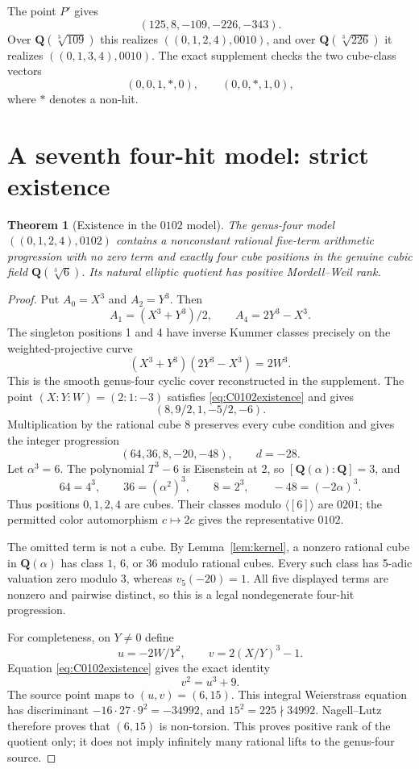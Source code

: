 \documentclass[10pt]{article}
\newtheorem{theorem}{Theorem}[section]
\newcommand{\Q}{\mathbf Q}
\begin{document}
The point $P'$ gives
\[
 (125,8,-109,-226,-343).
\]
Over $\Q(\sqrt[3]{109})$ this realizes $((0,1,2,4),0010)$, and over
$\Q(\sqrt[3]{226})$ it realizes $((0,1,3,4),0010)$.  The exact supplement
checks the two cube-class vectors
\[
 (0,0,1,\ast,0),\qquad (0,0,\ast,1,0),
\]
where $\ast$ denotes a non-hit.


\section{A seventh four-hit model: strict existence}

\begin{theorem}[Existence in the $0102$ model]\label{thm:0102existence}
The genus-four model $((0,1,2,4),0102)$ contains a nonconstant rational
five-term arithmetic progression with no zero term and exactly four cube
positions in the genuine cubic field $\Q(\sqrt[3]{6})$.  Its natural
elliptic quotient has positive Mordell--Weil rank.
\end{theorem}

\begin{proof}
Put $A_0=X^3$ and $A_2=Y^3$.  Then
\[
 A_1=(X^3+Y^3)/2,\qquad A_4=2Y^3-X^3.
\]
The singleton positions 1 and 4 have inverse Kummer classes precisely on
the weighted-projective curve
\begin{equation}\label{eq:C0102existence}
 (X^3+Y^3)(2Y^3-X^3)=2W^3.
\end{equation}
This is the smooth genus-four cyclic cover reconstructed in the supplement.
The point $(X:Y:W)=(2:1:-3)$ satisfies \eqref{eq:C0102existence} and gives
\[
 (8,9/2,1,-5/2,-6).
\]
Multiplication by the rational cube $8$ preserves every cube condition and
gives the integer progression
\[
 (64,36,8,-20,-48),\qquad d=-28.
\]
Let $\alpha^3=6$.  The polynomial $T^3-6$ is Eisenstein at 2, so
$[\Q(\alpha):\Q]=3$, and
\[
 64=4^3,\qquad 36=(\alpha^2)^3,\qquad
 8=2^3,\qquad -48=(-2\alpha)^3.
\]
Thus positions $0,1,2,4$ are cubes.  Their classes modulo
$\langle[6]\rangle$ are $0201$; the permitted color automorphism
$c\mapsto2c$ gives the representative $0102$.

The omitted term is not a cube.  By Lemma~\ref{lem:kernel}, a nonzero
rational cube in $\Q(\alpha)$ has class $1$, $6$, or $36$ modulo rational
cubes.  Every such class has 5-adic valuation zero modulo 3, whereas
$v_5(-20)=1$.  All five displayed terms are nonzero and pairwise distinct,
so this is a legal nondegenerate four-hit progression.

For completeness, on $Y\ne0$ define
\[
 u=-2W/Y^2,\qquad v=2(X/Y)^3-1.
\]
Equation \eqref{eq:C0102existence} gives the exact identity
\[
 v^2=u^3+9.
\]
The source point maps to $(u,v)=(6,15)$.  This integral Weierstrass equation
has discriminant $-16\cdot27\cdot9^2=-34992$, and
$15^2=225\nmid34992$.  Nagell--Lutz therefore proves that $(6,15)$ is
non-torsion.  This proves positive rank of the quotient only; it does not
imply infinitely many rational lifts to the genus-four source.
\end{proof}
\end{document}
